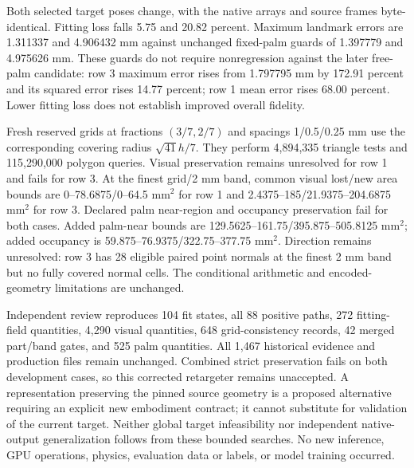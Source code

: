\documentclass[10pt,letterpaper]{article}
\begin{document}
Both selected target poses change, with the native arrays and source frames
byte-identical. Fitting loss falls 5.75 and 20.82 percent. Maximum landmark
errors are 1.311337 and 4.906432 mm against unchanged fixed-palm guards of
1.397779 and 4.975626 mm. These guards do not require nonregression against
the later free-palm candidate: row 3 maximum error rises from 1.797795 mm
by 172.91 percent and its squared error rises 14.77 percent; row 1 mean
error rises 68.00 percent. Lower fitting loss does not establish improved
overall fidelity.

Fresh reserved grids at fractions $(3/7,2/7)$ and spacings 1/0.5/0.25 mm
use the corresponding covering radius $\sqrt{41}h/7$. They perform
4,894,335 triangle tests and 115,290,000 polygon queries. Visual preservation
remains unresolved for row 1 and fails for row 3. At the finest grid/2 mm
band, common visual lost/new area bounds are 0--78.6875/0--64.5 mm$^2$
for row 1 and 2.4375--185/21.9375--204.6875 mm$^2$ for row 3. Declared
palm near-region and occupancy preservation fail for both cases. Added
palm-near bounds are 129.5625--161.75/395.875--505.8125 mm$^2$; added
occupancy is 59.875--76.9375/322.75--377.75 mm$^2$. Direction remains
unresolved: row 3 has 28 eligible paired point normals at the finest 2 mm
band but no fully covered normal cells. The conditional arithmetic and
encoded-geometry limitations are unchanged.

Independent review reproduces 104 fit states, all 88 positive paths,
272 fitting-field quantities, 4,290 visual quantities, 648 grid-consistency
records, 42 merged part/band gates, and 525 palm quantities. All 1,467
historical evidence and production files remain unchanged. Combined strict
preservation fails on both development cases, so this corrected retargeter
remains unaccepted. A representation preserving the pinned source geometry
is a proposed alternative requiring an explicit new embodiment contract;
it cannot substitute for validation of the current target. Neither global
target infeasibility nor independent native-output generalization follows
from these bounded searches. No new inference, GPU operations, physics,
evaluation data or labels, or model training occurred.
\end{document}
